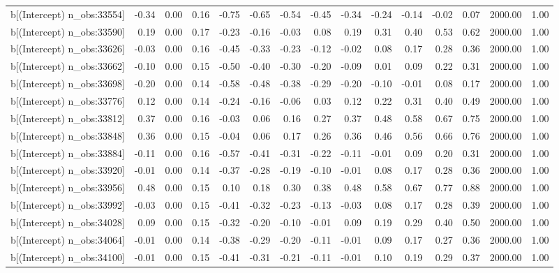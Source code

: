 \begin{table}[ht]
\begin{tabular}{rrrrrrrrrrrrrrr}
  b[(Intercept) n\_obs:33554] & -0.34 & 0.00 & 0.16 & -0.75 & -0.65 & -0.54 & -0.45 & -0.34 & -0.24 & -0.14 & -0.02 & 0.07 & 2000.00 & 1.00 \\ 
  b[(Intercept) n\_obs:33590] & 0.19 & 0.00 & 0.17 & -0.23 & -0.16 & -0.03 & 0.08 & 0.19 & 0.31 & 0.40 & 0.53 & 0.62 & 2000.00 & 1.00 \\ 
  b[(Intercept) n\_obs:33626] & -0.03 & 0.00 & 0.16 & -0.45 & -0.33 & -0.23 & -0.12 & -0.02 & 0.08 & 0.17 & 0.28 & 0.36 & 2000.00 & 1.00 \\ 
  b[(Intercept) n\_obs:33662] & -0.10 & 0.00 & 0.15 & -0.50 & -0.40 & -0.30 & -0.20 & -0.09 & 0.01 & 0.09 & 0.22 & 0.31 & 2000.00 & 1.00 \\ 
  b[(Intercept) n\_obs:33698] & -0.20 & 0.00 & 0.14 & -0.58 & -0.48 & -0.38 & -0.29 & -0.20 & -0.10 & -0.01 & 0.08 & 0.17 & 2000.00 & 1.00 \\ 
  b[(Intercept) n\_obs:33776] & 0.12 & 0.00 & 0.14 & -0.24 & -0.16 & -0.06 & 0.03 & 0.12 & 0.22 & 0.31 & 0.40 & 0.49 & 2000.00 & 1.00 \\ 
  b[(Intercept) n\_obs:33812] & 0.37 & 0.00 & 0.16 & -0.03 & 0.06 & 0.16 & 0.27 & 0.37 & 0.48 & 0.58 & 0.67 & 0.75 & 2000.00 & 1.00 \\ 
  b[(Intercept) n\_obs:33848] & 0.36 & 0.00 & 0.15 & -0.04 & 0.06 & 0.17 & 0.26 & 0.36 & 0.46 & 0.56 & 0.66 & 0.76 & 2000.00 & 1.00 \\ 
  b[(Intercept) n\_obs:33884] & -0.11 & 0.00 & 0.16 & -0.57 & -0.41 & -0.31 & -0.22 & -0.11 & -0.01 & 0.09 & 0.20 & 0.31 & 2000.00 & 1.00 \\ 
  b[(Intercept) n\_obs:33920] & -0.01 & 0.00 & 0.14 & -0.37 & -0.28 & -0.19 & -0.10 & -0.01 & 0.08 & 0.17 & 0.28 & 0.36 & 2000.00 & 1.00 \\ 
  b[(Intercept) n\_obs:33956] & 0.48 & 0.00 & 0.15 & 0.10 & 0.18 & 0.30 & 0.38 & 0.48 & 0.58 & 0.67 & 0.77 & 0.88 & 2000.00 & 1.00 \\ 
  b[(Intercept) n\_obs:33992] & -0.03 & 0.00 & 0.15 & -0.41 & -0.32 & -0.23 & -0.13 & -0.03 & 0.08 & 0.17 & 0.28 & 0.39 & 2000.00 & 1.00 \\ 
  b[(Intercept) n\_obs:34028] & 0.09 & 0.00 & 0.15 & -0.32 & -0.20 & -0.10 & -0.01 & 0.09 & 0.19 & 0.29 & 0.40 & 0.50 & 2000.00 & 1.00 \\ 
  b[(Intercept) n\_obs:34064] & -0.01 & 0.00 & 0.14 & -0.38 & -0.29 & -0.20 & -0.11 & -0.01 & 0.09 & 0.17 & 0.27 & 0.36 & 2000.00 & 1.00 \\ 
  b[(Intercept) n\_obs:34100] & -0.01 & 0.00 & 0.15 & -0.41 & -0.31 & -0.21 & -0.11 & -0.01 & 0.10 & 0.19 & 0.29 & 0.37 & 2000.00 & 1.00 \\ 

\end{tabular}
\end{table}
